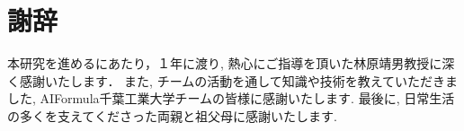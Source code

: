\chapter*{謝辞}

本研究を進めるにあたり，１年に渡り, 熱心にご指導を頂いた林原靖男教授に深く感謝いたします．
また, チームの活動を通して知識や技術を教えていただきました, AIFormula千葉工業大学チームの皆様に感謝いたします.
最後に, 日常生活の多くを支えてくださった両親と祖父母に感謝いたします.

%
